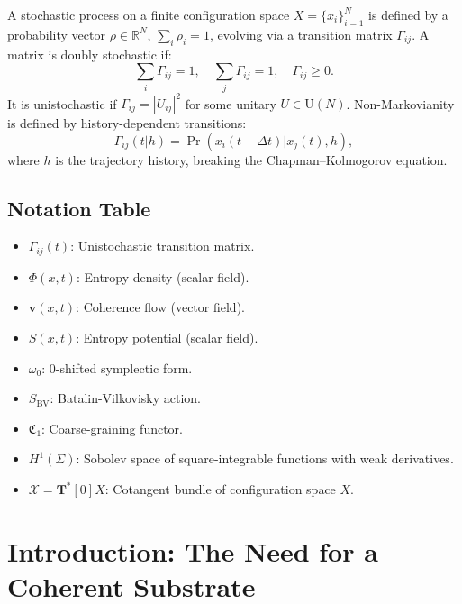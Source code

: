 \documentclass[12pt]{article}
\begin{document}
A stochastic process on a finite configuration space \(X = \{x_i\}_{i=1}^N\) is defined by a probability vector \(\rho \in \mathbb{R}^N\), \(\sum_i \rho_i = 1\), evolving via a transition matrix \(\Gamma_{ij}\). A matrix is doubly stochastic if:
\[
\sum_i \Gamma_{ij} = 1, \quad \sum_j \Gamma_{ij} = 1, \quad \Gamma_{ij} \geq 0.
\]
It is unistochastic if \(\Gamma_{ij} = |U_{ij}|^2\) for some unitary \(U \in \mathrm{U}(N)\). Non-Markovianity is defined by history-dependent transitions:
\[
\Gamma_{ij}(t | h) = \Pr(x_i(t+\Delta t) | x_j(t), h),
\]
where \(h\) is the trajectory history, breaking the Chapman–Kolmogorov equation.

\subsection{Notation Table}

\begin{itemize}[noitemsep]
\item \(\Gamma_{ij}(t)\): Unistochastic transition matrix.
\item \(\Phi(x,t)\): Entropy density (scalar field).
\item \(\mathbf{v}(x,t)\): Coherence flow (vector field).
\item \(S(x,t)\): Entropy potential (scalar field).
\item \(\omega_0\): 0-shifted symplectic form.
\item \(S_{\mathrm{BV}}\): Batalin-Vilkovisky action.
\item \(\mathfrak{C}_1\): Coarse-graining functor.
\item \(H^1(\Sigma)\): Sobolev space of square-integrable functions with weak derivatives.
\item \(\mathcal{X} = \mathbf{T}^*[0]X\): Cotangent bundle of configuration space \(X\).
\end{itemize}

\section{Introduction: The Need for a Coherent Substrate}
\end{document}
